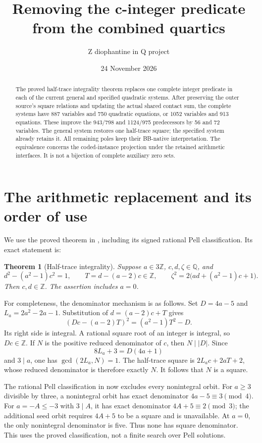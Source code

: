 \documentclass[11pt]{article}
\title{Removing the c-integer predicate from the combined quartics}
\author{Z diophantine in Q project}
\date{24 November 2026}
\newtheorem{theorem}{Theorem}
\newcommand{\Q}{\mathbb Q}\newcommand{\Z}{\mathbb Z}
\begin{document}
\maketitle

\begin{abstract}
The proved half-trace integrality theorem replaces one complete
integer predicate in each of the current general and specified
quadratic systems. After preserving the outer source's square
relations and updating the actual shared contact sum, the complete
systems have 887 variables and 750 quadratic equations, or 1052
variables and 913 equations. These improve the 943/798 and
1124/975 predecessors by 56 and 72 variables. The general system
restores one half-trace square; the specified system already
retains it. All remaining poles keep their BB-native interpretation.
The equivalence concerns the coded-instance projection under the
retained arithmetic interfaces. It is not a bijection of complete
auxiliary zero sets.
\end{abstract}

\section{The arithmetic replacement and its order of use}

We use the proved theorem in \cite{replacement}, including its
signed rational Pell classification. Its exact statement is:
\begin{theorem}[Half-trace integrality]\label{arithmetic}
Suppose $a\in3\Z$, $c,d,\zeta\in\Q$, and
\[
 d^2-(a^2-1)c^2=1,\qquad
 T=d-(a-2)c\in\Z,\qquad
 \zeta^2=2\bigl(ad+(a^2-1)c+1\bigr).
\]
Then $c,d\in\Z$. The assertion includes $a=0$.
\end{theorem}

For completeness, the denominator mechanism is as follows. Set
$D=4a-5$ and $L_a=2a^2-2a-1$. Substitution of
$d=(a-2)c+T$ gives
\[
 (Dc-(a-2)T)^2=(a^2-1)T^2-D.
\]
Its right side is integral. A rational square root of an integer
is integral, so $Dc\in\Z$. If $N$ is the positive reduced
denominator of $c$, then $N\mid|D|$. Since
\[
                 8L_a+3=D(4a+1)
\]
and $3\mid a$, one has $\gcd(2L_a,N)=1$. The half-trace square
is $2L_a c+2aT+2$, whose reduced denominator is therefore
exactly $N$. It follows that $N$ is a square.

The rational Pell classification in \cite{replacement} now excludes
every nonintegral orbit. For $a\ge3$ divisible by three, a
nonintegral orbit has exact denominator $4a-5\equiv3\pmod4$.
For $a=-A\le-3$ with $3\mid A$, it has exact denominator
$4A+5\equiv2\pmod3$; the additional seed orbit requires $4A+5$
to be a square and is unavailable. At $a=0$, the only
nonintegral denominator is five. Thus none has square denominator.
This uses the proved classification, not a finite search over Pell
solutions.
\end{document}
